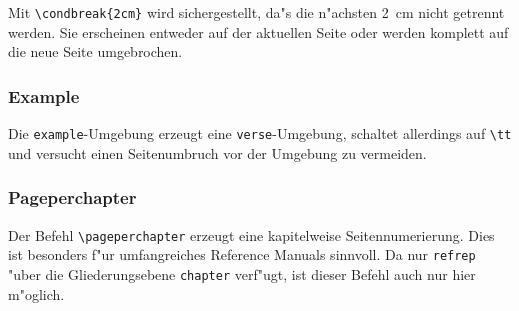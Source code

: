 Mit \verb|\condbreak{2cm}| wird sichergestellt, da"s die n"achsten 2~cm 
nicht getrennt werden. Sie erscheinen entweder auf der aktuellen Seite 
oder werden komplett auf die neue Seite umgebrochen.

\subsubsection{Example}

Die {\tt example}-Umgebung erzeugt eine {\tt verse}-Umgebung, schaltet 
allerdings auf \verb|\tt| und versucht einen Seitenumbruch vor der 
Umgebung zu vermeiden.

\subsubsection{Pageperchapter}

Der Befehl \verb|\pageperchapter| erzeugt eine kapitelweise 
Seitennumerierung. Dies ist besonders f"ur umfangreiches 
Reference Manuals sinnvoll. Da nur \texttt{refrep} "uber die 
Gliederungsebene \texttt{chapter} verf"ugt, ist dieser Befehl 
auch nur hier m"oglich.

\printindex
\endinput

